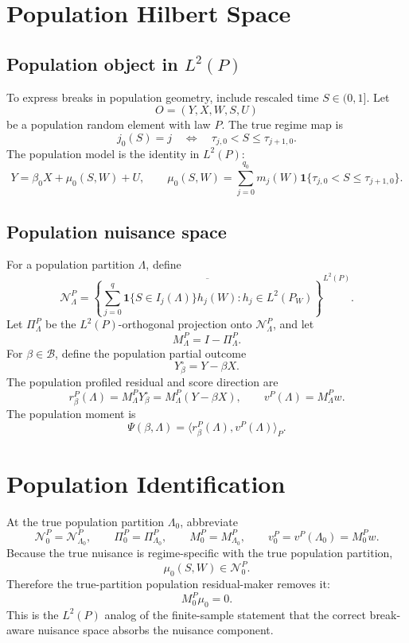 \documentclass[12pt]{article}
\numberwithin{equation}{section}
\theoremstyle{definition}
\newcommand{\ind}{\mathbf 1}
\newcommand{\N}{\mathcal N}
\newcommand{\LtwoP}{L^2(P)}
\newcommand{\innerP}[2]{\langle #1,#2\rangle_P}
\begin{document}
\section{Population Hilbert Space}

\subsection{Population object in \texorpdfstring{\(L^2(P)\)}{L2P}}

To express breaks in population geometry, include rescaled time \(S\in(0,1]\).
Let
\[
    O=(Y,X,W,S,U)
\]
be a population random element with law \(P\). The true regime map is
\[
    j_0(S)=j
    \quad\Longleftrightarrow\quad
    \tau_{j,0}<S\le\tau_{j+1,0}.
\]
The population model is the identity in \(\LtwoP\):
\begin{equation}
    Y=\beta_0X+\mu_0(S,W)+U,
    \qquad
    \mu_0(S,W)=\sum_{j=0}^{q_0}m_j(W)
    \ind\{\tau_{j,0}<S\le\tau_{j+1,0}\}.
    \label{eq:l2p-model}
\end{equation}

\subsection{Population nuisance space}

For a population partition \(\Lambda\), define
\[
    \N_\Lambda^P
    =\overline{\left\{
      \sum_{j=0}^{q} \ind\{S\in I_j(\Lambda)\}h_j(W):
      h_j\in L^2(P_W)
    \right\}}^{L^2(P)}.
\]
Let \(\Pi_\Lambda^P\) be the \(\LtwoP\)-orthogonal projection onto
\(\N_\Lambda^P\), and let
\[
    M_\Lambda^P=I-\Pi_\Lambda^P.
\]
For \(\beta\in\mathcal B\), define the population partial outcome
\[
    Y_\beta^\circ=Y-\beta X.
\]
The population profiled residual and score direction are
\[
    r_\beta^P(\Lambda)=M_\Lambda^PY_\beta^\circ
    =M_\Lambda^P(Y-\beta X),
    \qquad
    v^P(\Lambda)=M_\Lambda^Pw.
\]
The population moment is
\begin{equation}
    \Psi(\beta,\Lambda)
    =\innerP{r_\beta^P(\Lambda)}{v^P(\Lambda)}.
    \label{eq:population-moment}
\end{equation}

\section{Population Identification}

At the true population partition \(\Lambda_0\), abbreviate
\[
    \N_0^P=\N_{\Lambda_0}^P,
    \qquad
    \Pi_0^P=\Pi_{\Lambda_0}^P,
    \qquad
    M_0^P=M_{\Lambda_0}^P,
    \qquad
    v_0^P=v^P(\Lambda_0)=M_0^Pw.
\]
Because the true nuisance is regime-specific with the true population partition,
\[
    \mu_0(S,W)\in\N_0^P.
\]
Therefore the true-partition population residual-maker removes it:
\begin{equation}
    M_0^P\mu_0=0.
    \label{eq:population-nuisance-cancellation}
\end{equation}
This is the \(L^2(P)\) analog of the finite-sample statement that the correct
break-aware nuisance space absorbs the nuisance component.
\end{document}
